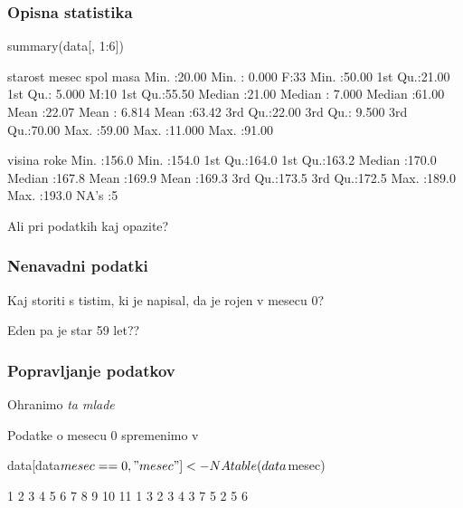 \begin{frame}[fragile]
\frametitle{Opisna statistika}
\begin{Schunk}
\begin{Sinput}
  summary(data[, 1:6])
\end{Sinput}
\begin{Soutput}
    starost          mesec        spol        masa      
 Min.   :20.00   Min.   : 0.000   F:33   Min.   :50.00  
 1st Qu.:21.00   1st Qu.: 5.000   M:10   1st Qu.:55.50  
 Median :21.00   Median : 7.000          Median :61.00  
 Mean   :22.07   Mean   : 6.814          Mean   :63.42  
 3rd Qu.:22.00   3rd Qu.: 9.500          3rd Qu.:70.00  
 Max.   :59.00   Max.   :11.000          Max.   :91.00  
                                                        
     visina           roke      
 Min.   :156.0   Min.   :154.0  
 1st Qu.:164.0   1st Qu.:163.2  
 Median :170.0   Median :167.8  
 Mean   :169.9   Mean   :169.3  
 3rd Qu.:173.5   3rd Qu.:172.5  
 Max.   :189.0   Max.   :193.0  
                 NA's   :5      
\end{Soutput}
\end{Schunk}
Ali pri podatkih kaj opazite?
\end{frame}
\begin{frame}[fragile]
\frametitle{Nenavadni podatki}
Kaj storiti s tistim, ki je napisal, da je rojen v mesecu 0?

Eden pa je star 59 let??
\end{frame}

\begin{frame}[fragile]
\frametitle{Popravljanje podatkov}
Ohranimo  \emph{ta mlade}
\begin{Schunk}
\end{Schunk}
Podatke o mesecu 0 spremenimo v 

\begin{Schunk}
\begin{Sinput}
  data[data$mesec == 0, "mesec"] <- NA
  table(data$mesec)
\end{Sinput}
\begin{Soutput}
 1  2  3  4  5  6  7  8  9 10 11 
 1  3  2  3  4  3  7  5  2  5  6 
\end{Soutput}
\end{Schunk}

\end{frame}



